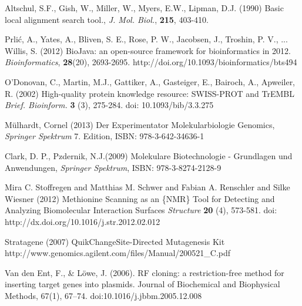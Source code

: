 \documentclass{bioinfo}
\begin{document}
%
%
%
%
%
%
%
%
%


\begin{thebibliography}{}

Altschul, S.F., Gish, W., Miller, W., Myers, E.W., Lipman, D.J. (1990) Basic local alignment search tool., {\it J. Mol. Biol.}, {\bf 215}, 403-410.

Prli\'{c}, A., Yates, A., Bliven, S. E., Rose, P. W., Jacobsen, J., Troshin, P. V., ... Willis, S. (2012) BioJava: an open-source framework for bioinformatics in 2012. {\it Bioinformatics}, {\bf 28}(20), 2693-2695. http://doi.org/10.1093/bioinformatics/bts494

O'Donovan, C., Martin, M.J., Gattiker, A., Gasteiger, E., Bairoch, A., Apweiler, R. (2002) High-quality protein knowledge resource: SWISS-PROT and TrEMBL {\it Brief. Bioinform.}  {\bf 3} (3), 275-284. doi: 10.1093/bib/3.3.275 

Mülhardt, Cornel (2013) 
Der Experimentator Molekularbiologie Genomics,
{\it Springer Spektrum} 7. Edition,
ISBN: 978-3-642-34636-1

Clark, D. P., Pzdernik, N.J.(2009) 
Molekulare Biotechnologie - Grundlagen und Anwendungen, 
{\it Springer Spektrum},
ISBN: 978-3-8274-2128-9

Mira C. Stoffregen and Matthias M. Schwer and Fabian A. Renschler and Silke Wiesner (2012) Methionine Scanning as an \{NMR\} Tool for Detecting and Analyzing Biomolecular Interaction Surfaces {\it Structure} {\bf 20} (4), 573-581. doi: http://dx.doi.org/10.1016/j.str.2012.02.012

Stratagene (2007) QuikChange\textregistered Site-Directed Mutagenesis Kit 
 http://www.genomics.agilent.com/files/Manual/200521_C.pdf
 
 Van den Ent, F., & Löwe, J. (2006). RF cloning: a restriction-free method for inserting target genes into plasmids. Journal of Biochemical and Biophysical Methods, 67(1), 67–74. doi:10.1016/j.jbbm.2005.12.008
 
\end{thebibliography}
\end{document}
